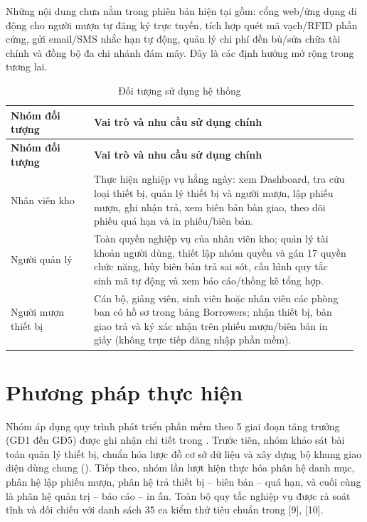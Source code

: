 Những nội dung chưa nằm trong phiên bản hiện tại gồm: cổng web/ứng dụng di động cho người mượn tự đăng ký trực tuyến, tích hợp quét mã vạch/RFID phần cứng, gửi email/SMS nhắc hạn tự động, quản lý chi phí đền bù/sửa chữa tài chính và đồng bộ đa chi nhánh đám mây. Đây là các định hướng mở rộng trong tương lai.


{\small\setlength{\tabcolsep}{3pt}\renewcommand{\arraystretch}{1.25}
\begin{longtable}{|>{\raggedright\arraybackslash}p{0.233\linewidth}|>{\raggedright\arraybackslash}p{0.737\linewidth}|}
\caption{Đối tượng sử dụng hệ thống}\\
\hline
\rowcolor{gray!25}\textbf{\textbf{Nhóm đối tượng}} & \textbf{\textbf{Vai trò và nhu cầu sử dụng chính}} \\ \hline
\endfirsthead
\hline
\rowcolor{gray!25}\textbf{\textbf{Nhóm đối tượng}} & \textbf{\textbf{Vai trò và nhu cầu sử dụng chính}} \\ \hline
\endhead
\hline\endfoot
Nhân viên kho & Thực hiện nghiệp vụ hằng ngày: xem Dashboard, tra cứu loại thiết bị, quản lý thiết bị và người mượn, lập phiếu mượn, ghi nhận trả, xem biên bản bàn giao, theo dõi phiếu quá hạn và in phiếu/biên bản. \\ \hline
Người quản lý & Toàn quyền nghiệp vụ của nhân viên kho; quản lý tài khoản người dùng, thiết lập nhóm quyền và gán 17 quyền chức năng, hủy biên bản trả sai sót, cấu hình quy tắc sinh mã tự động và xem báo cáo/thống kê tổng hợp. \\ \hline
Người mượn thiết bị & Cán bộ, giảng viên, sinh viên hoặc nhân viên các phòng ban có hồ sơ trong bảng Borrowers; nhận thiết bị, bàn giao trả và ký xác nhận trên phiếu mượn/biên bản in giấy (không trực tiếp đăng nhập phần mềm). \\ \hline
\end{longtable}
}

\section{Phương pháp thực hiện}

Nhóm áp dụng quy trình phát triển phần mềm theo 5 giai đoạn tăng trưởng (GĐ1 đến GĐ5) được ghi nhận chi tiết trong . Trước tiên, nhóm khảo sát bài toán quản lý thiết bị, chuẩn hóa lược đồ cơ sở dữ liệu và xây dựng bộ khung giao diện dùng chung (). Tiếp theo, nhóm lần lượt hiện thực hóa phân hệ danh mục, phân hệ lập phiếu mượn, phân hệ trả thiết bị – biên bản – quá hạn, và cuối cùng là phân hệ quản trị – báo cáo – in ấn. Toàn bộ quy tắc nghiệp vụ được rà soát tĩnh và đối chiếu với danh sách 35 ca kiểm thử tiêu chuẩn trong  [9], [10].

